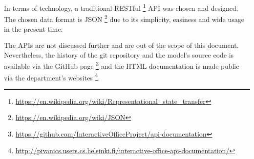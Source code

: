 In terms of technology, a traditional RESTful \footnote{\url{https://en.wikipedia.org/wiki/Representational\_state\_transfer}} API was chosen and designed. The chosen data format is JSON \footnote{\url{https://en.wikipedia.org/wiki/JSON}} due to its simplicity, easiness and wide usage in the present time. 

The APIs are not discussed further and are out of the scope of this document. Nevertheless, the history of the git repository and the model's source code is available via the GitHub page \footnote{\url{https://github.com/InteractiveOfficeProject/api-documentation}} and the HTML documentation is made public via the department's websites \footnote{\url{http://pivanics.users.cs.helsinki.fi/interactive-office-api-documentation/}}. 